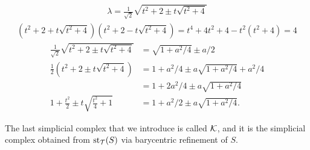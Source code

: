 \documentclass[a4paper]{article}
\begin{document}
\begin{align*}
    \lambda = \frac{1}{\sqrt 2} \sqrt{ t^2 + 2 \pm t \sqrt{ t^2 + 4 } } 
\end{align*}
\begin{align*}
    \left( t^2 + 2 + t \sqrt{ t^2 + 4 } \right)
    \left( t^2 + 2 - t \sqrt{ t^2 + 4 } \right)
    =
    t^{4} + 4 t^{2} + 4
    -
    t^{2} ( t^{2} + 4 )
    =
    4
\end{align*}
\begin{align*}
    \frac{1}{\sqrt 2} \sqrt{ t^2 + 2 \pm t \sqrt{ t^2 + 4 } } 
    &=
    \sqrt{1+a^2/4} \pm a/2
    \\
    \frac 1 2 \left( t^2 + 2 \pm t \sqrt{ t^2 + 4 } \right)
    &=
    1+a^2/4
    \pm
    a \sqrt{1+a^2/4}
    + 
    a^2/4
    \\&=
    1
    +
    2a^2/4
    \pm
    a \sqrt{1+a^2/4}
    \\
    1 + \frac{t^2}{2} \pm t \sqrt{ \frac{t^2}{4} + 1 } 
    &=
    1
    +
    a^2/2
    \pm
    a \sqrt{1+a^2/4}
    .
\end{align*}
\color{black}




















        \item 
        The last simplicial complex that we introduce is called ${\mathcal K}$,
        and it is the simplicial complex obtained from $\operatorname{st}_{{\mathcal T}}(S)$ via barycentric refinement of $S$. 
        
\end{document}
